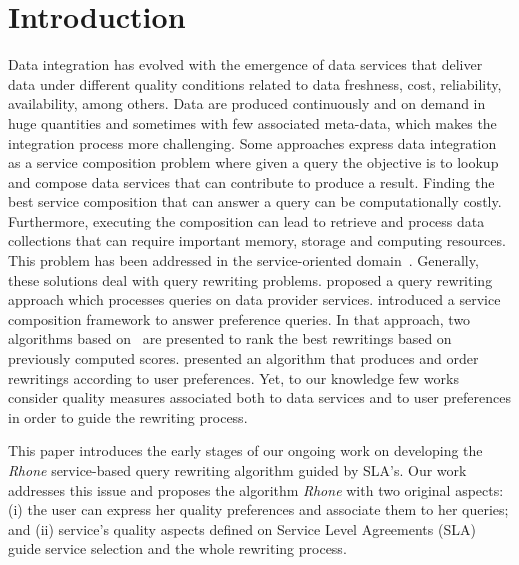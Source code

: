 \section{Introduction}
Data integration has evolved with the emergence of data services that deliver
data under different quality conditions related to data freshness, cost, reliability,
availability, among others. Data are produced continuously and on demand in huge
quantities and sometimes with few associated meta-data, which makes the
integration process more challenging. Some approaches express data integration
as a service composition problem where given a query the objective is to lookup and compose data services that can contribute to produce a result. Finding the best service composition that can answer a query can be computationally costly. Furthermore,  executing the composition can lead to retrieve and process data collections that can require important memory, storage and computing resources.
This problem has been addressed in the service-oriented
domain~\cite{Barhamgi2010,Benouaret2011,ba2014}.
Generally, these solutions deal with query rewriting problems.
\cite{Barhamgi2010} proposed a query rewriting approach which processes queries
on data provider services. \cite{Benouaret2011} introduced a service composition
framework to answer preference queries. In that approach, two algorithms based
on~\cite{Barhamgi2010} are presented to rank the best rewritings based on previously computed scores.
\cite{ba2014} presented an algorithm that produces and order rewritings
according to user preferences. Yet, to our knowledge few works consider quality
measures associated both to data services and to user preferences in order to
guide the rewriting process. 


This paper introduces the early stages of our
ongoing work on developing the \textit{Rhone} service-based query rewriting
algorithm guided by SLA's. Our work addresses this issue and proposes the 
algorithm \textit{Rhone} with two original aspects: (i) the user can express
her quality preferences and associate them to her queries; and (ii)  service's
quality aspects defined on Service Level Agreements (SLA) guide service
selection and  the whole rewriting process.

